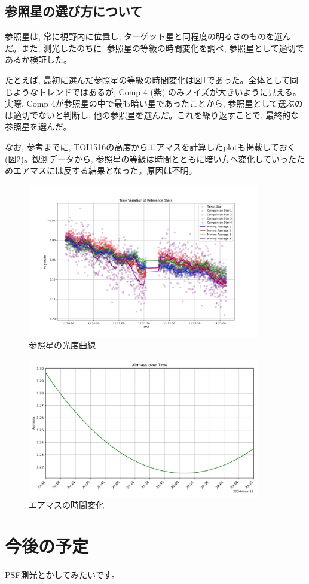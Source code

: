 \documentclass[dvipdfmx,a4paper]{jsarticle}
\begin{document}
\subsection{参照星の選び方について}
参照星は, 常に視野内に位置し, ターゲット星と同程度の明るさのものを選んだ。また, 測光したのちに, 参照星の等級の時間変化を調べ, 参照星として適切であるか検証した。

たとえば, 最初に選んだ参照星の等級の時間変化は図\ref{fig:comp}であった。全体として同じようなトレンドではあるが, Comp 4 (紫) のみノイズが大きいように見える。実際, Comp 4が参照星の中で最も暗い星であったことから, 参照星として選ぶのは適切でないと判断し, 他の参照星を選んだ。これを繰り返すことで, 最終的な参照星を選んだ。

なお, 参考までに, TOI1516の高度からエアマスを計算したplotも掲載しておく (図\ref{fig:airmass})。観測データから, 参照星の等級は時間とともに暗い方へ変化していったためエアマスには反する結果となった。原因は不明。

\begin{figure}[H]
  \centering
  \includegraphics[width=0.9\textwidth]{./fig/light_curve_comp_first.png}
  \caption{参照星の光度曲線}
  \label{fig:comp}
\end{figure}

\begin{figure}[H]
  \centering
  \includegraphics[width=0.9\textwidth]{./fig/airmass_over_time.png}
  \caption{エアマスの時間変化}
  \label{fig:airmass}
\end{figure}

\section{今後の予定}
PSF測光とかしてみたいです。
\end{document}
